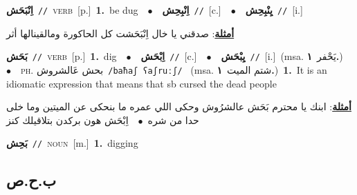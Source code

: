 \documentclass[10pt,a4paper,twoside]{article} %
\begin{document}
\begin{multicols}{2}
{\setlength\topsep{0pt}\textbf{\foreignlanguage{arabic}{اِنْبَحَش}}\ {\color{gray}\texttt{//}\color{black}}\ \textsc{verb}\ [p.]\ \textbf{1.}~be dug\ \ $\bullet$\ \ \setlength\topsep{0pt}\textbf{\foreignlanguage{arabic}{اِنْبِحِش}}\ {\color{gray}\texttt{//}\color{black}}\ [c.]\ \ $\bullet$\ \ \setlength\topsep{0pt}\textbf{\foreignlanguage{arabic}{يِنْبِحِش}}\ {\color{gray}\texttt{//}\color{black}}\ [i.]\  \begin{flushright}\color{gray}\foreignlanguage{arabic}{\textbf{\underline{\foreignlanguage{arabic}{أمثلة}}}: صدقني يا خال اِنْبَحَشت كل الحاكورة ومالقينالها أثر}\end{flushright}\color{black}} \vspace{2mm}

{\setlength\topsep{0pt}\textbf{\foreignlanguage{arabic}{بَحَش}}\ {\color{gray}\texttt{//}\color{black}}\ \textsc{verb}\ [p.]\ \textbf{1.}~dig\ \ $\bullet$\ \ \setlength\topsep{0pt}\textbf{\foreignlanguage{arabic}{اِبْحَش}}\ {\color{gray}\texttt{//}\color{black}}\ [c.]\ \ $\bullet$\ \ \setlength\topsep{0pt}\textbf{\foreignlanguage{arabic}{يِبْحَش}}\ {\color{gray}\texttt{//}\color{black}}\ [i.]\ \color{gray}(msa. \foreignlanguage{arabic}{يَحْفر}~\foreignlanguage{arabic}{\textbf{١.}})\color{black}\ \ $\bullet$\ \ \textsc{ph.} \color{gray} \foreignlanguage{arabic}{بحش عَالشروش}\color{black}\ {\color{gray}\texttt{/{\sffamily baħaʃ ʕaʃruːʃ}/}\color{black}}\ \color{gray} (msa. \foreignlanguage{arabic}{شتم الميت}~\foreignlanguage{arabic}{\textbf{١.}})\color{black}\ \textbf{1.}~It is an idiomatic expression that means that sb cursed the dead people\  \begin{flushright}\color{gray}\foreignlanguage{arabic}{\textbf{\underline{\foreignlanguage{arabic}{أمثلة}}}: ابنك يا محترم بَحَش عالشرُوش وحكى اللي عمره ما بنحكى عن الميتين وما خلى حدا من شره\ $\bullet$\ \  اِبْحَش هون بركدن بتلاقيلك كنز}\end{flushright}\color{black}} \vspace{2mm}

{\setlength\topsep{0pt}\textbf{\foreignlanguage{arabic}{بَحِش}}\ {\color{gray}\texttt{//}\color{black}}\ \textsc{noun}\ [m.]\ \textbf{1.}~digging\ } \vspace{2mm}

\vspace{-3mm}
\subsection*{\color{blue}\foreignlanguage{arabic}{ب.ح.ص}\color{blue}{}} 


\end{multicols}
\end{document}
